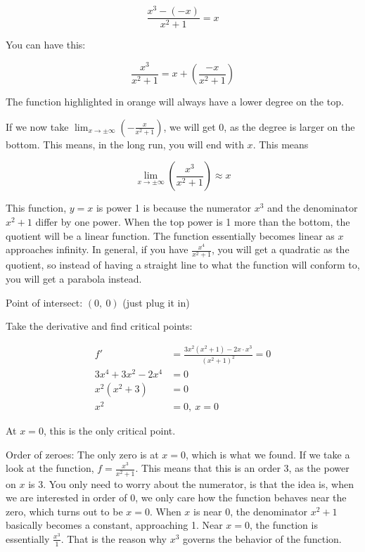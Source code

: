 \documentclass[12pt]{article}
\theoremstyle{plain}
\theoremstyle{remark}
\theoremstyle{definition}
\begin{document}
\[\frac{x^{3} - ( - x)}{x^{2} + 1} = x\]

You can have this:

\[\frac{x^{3}}{x^{2} + 1} = x + \left( \frac{- x}{x^{2} + 1} \right)\]

The function highlighted in orange will always have a lower degree on
the top.

If we now take
\(\lim_{x \rightarrow \pm \infty}\left( - \frac{x}{x^{2} + 1} \right)\),
we will get 0, as the degree is larger on the bottom. This means, in the
long run, you will end with \(x\). This means

\[{\lim_{x \rightarrow \pm \infty}\left( \frac{x^{3}}{x^{2} + 1} \right)} \approx x\]

This function, \(y = x\) is power 1 is because the numerator \(x^{3}\)
and the denominator \(x^{2} + 1\) differ by one power. When the top
power is 1 more than the bottom, the quotient will be a linear function.
The function essentially becomes linear as \(x\) approaches infinity. In
general, if you have \(\frac{x^{4}}{x^{2} + 1}\), you will get a
quadratic as the quotient, so instead of having a straight line to what
the function will conform to, you will get a parabola instead.

Point of intersect: \((0,\ 0)\) (just plug it in)

Take the derivative and find critical points:

\begin{align*}
f' &= \frac{3x^{2}\left( x^{2} + 1 \right) - 2x \cdot x^{3}}{\left( x^{2} + 1 \right)^{2}} = 0 \\
3x^{4} + 3x^{2} - 2x^{4} &= 0 \\
x^{2}\left( x^{2} + 3 \right) &= 0 \\
x^{2} &= 0,\ x = 0
\end{align*}


At \(x = 0\), this is the only critical point.

Order of zeroes: The only zero is at \(x = 0\), which is what we found.
If we take a look at the function, \(f = \frac{x^{3}}{x^{2} + 1}\). This
means that this is an order 3, as the power on \(x\) is 3. You only need
to worry about the numerator, is that the idea is, when we are
interested in order of 0, we only care how the function behaves near the
zero, which turns out to be \(x = 0\). When \(x\) is near 0, the
denominator \(x^{2} + 1\) basically becomes a constant, approaching 1.
Near \(x = 0\), the function is essentially \(\frac{x^{3}}{1}\). That is
the reason why \(x^{3}\) governs the behavior of the function.
\end{document}
